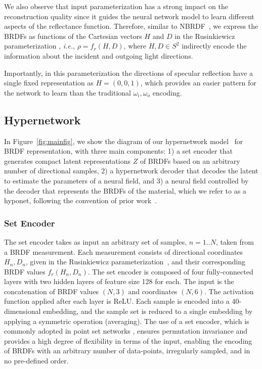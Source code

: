 We also observe that input parameterization has a strong impact on the reconstruction quality since it guides the neural network model to learn different aspects of the reflectance function. Therefore, similar to NBRDF~\cite{sztrajman2021neural}, we express the BRDFs as functions of the Cartesian vectors $H$ and $D$ in the Rusinkiewicz parameterization \cite{rusinkiewicz1998new},
\textit{i.e.}, $\rho=f_r(H, D)$, where $H, D \in S^2$ indirectly encode the information about the incident and outgoing light directions.

Importantly, in this parameterization the directions of specular reflection have a single fixed representation as $H=(0,0,1)$, which provides an easier pattern for the network to learn than the traditional $\omega_i, \omega_o$ encoding.


\subsection{Hypernetwork}
\label{sec:hypernet}

In Figure~\ref{fig:mainfig}, we show the diagram of our hypernetwork model~\cite{sitzmann2020siren} for BRDF representation, with three main components: 1) a set encoder that generates compact latent representations $Z$ of BRDFs based on an arbitrary number of directional samples, 2) a hypernetwork decoder that decodes the latent to estimate the parameters of a neural field,
and 3) a neural field controlled by the decoder that represents the BRDFs of the material, which we refer to as a hyponet, following the convention of prior work~\cite{sitzmann2020metasdf}.


\subsubsection{Set Encoder} %

The set encoder takes as input an arbitrary set of samples, $n=1..N$, taken from a BRDF measurement. Each measurement consists of directional coordinates ${H_n, D_n}$, given in the Rusinkiewicz parameterization~\cite{rusinkiewicz1998new}, and their corresponding BRDF values $f_r(H_n,D_n)$. The set encoder is composed of four fully-connected layers with two hidden layers of feature size 128 for each. The input is the concatenation of BRDF values $(N, 3)$ and coordinates $(N, 6)$. The activation function applied after each layer is ReLU. Each sample is encoded into a 40-dimensional embedding, and the sample set is reduced to a single embedding by applying a symmetric operation (averaging).
The use of a set encoder, which is commonly adopted in point set networks \cite{zaheer2017deepsets}, ensures permutation invariance and provides a high degree of flexibility in terms of the input, enabling the encoding of BRDFs with an arbitrary number of data-points, irregularly sampled, and in no pre-defined order.


